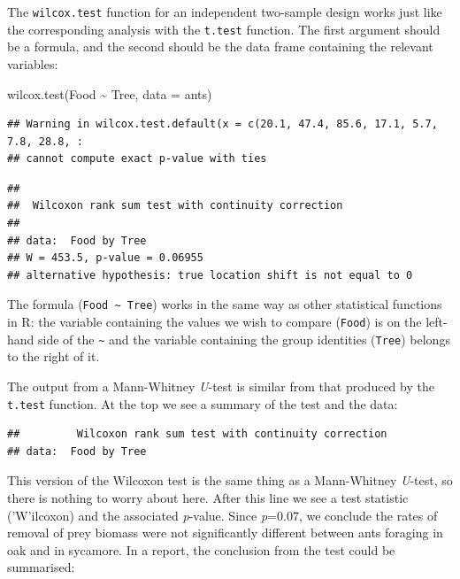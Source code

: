 \documentclass[
]{book}
\newenvironment{Shaded}{\begin{snugshade}}{\end{snugshade}}
\newcommand{\AttributeTok}[1]{\textcolor[rgb]{0.77,0.63,0.00}{#1}}
\newcommand{\FunctionTok}[1]{\textcolor[rgb]{0.00,0.00,0.00}{#1}}
\newcommand{\NormalTok}[1]{#1}
\newcommand{\SpecialCharTok}[1]{\textcolor[rgb]{0.00,0.00,0.00}{#1}}
\begin{document}
The \texttt{wilcox.test} function for an independent two-sample design works just like the corresponding analysis with the \texttt{t.test} function. The first argument should be a formula, and the second should be the data frame containing the relevant variables:

\begin{Shaded}
\begin{Highlighting}[]
\FunctionTok{wilcox.test}\NormalTok{(Food }\SpecialCharTok{\textasciitilde{}}\NormalTok{ Tree, }\AttributeTok{data =}\NormalTok{ ants)}
\end{Highlighting}
\end{Shaded}

\begin{verbatim}
## Warning in wilcox.test.default(x = c(20.1, 47.4, 85.6, 17.1, 5.7, 7.8, 28.8, :
## cannot compute exact p-value with ties
\end{verbatim}

\begin{verbatim}
## 
##  Wilcoxon rank sum test with continuity correction
## 
## data:  Food by Tree
## W = 453.5, p-value = 0.06955
## alternative hypothesis: true location shift is not equal to 0
\end{verbatim}

The formula (\texttt{Food\ \textasciitilde{}\ Tree}) works in the same way as other statistical functions in R: the variable containing the values we wish to compare (\texttt{Food}) is on the left-hand side of the \texttt{\textasciitilde{}} and the variable containing the group identities (\texttt{Tree}) belongs to the right of it.

The output from a Mann-Whitney \emph{U}-test is similar from that produced by the \texttt{t.test} function. At the top we see a summary of the test and the data:

\begin{verbatim}
##         Wilcoxon rank sum test with continuity correction
## data:  Food by Tree
\end{verbatim}

This version of the Wilcoxon test is the same thing as a Mann-Whitney \emph{U}-test, so there is nothing to worry about here. After this line we see a test statistic ('W'ilcoxon) and the associated \emph{p}-value. Since \emph{p}=0.07, we conclude the rates of removal of prey biomass were not significantly different between ants foraging in oak and in sycamore. In a report, the conclusion from the test could be summarised:
\end{document}

